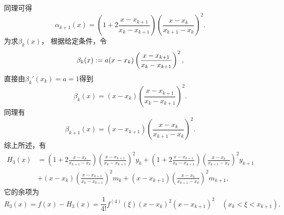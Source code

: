 同理可得\begin{equation*}
	\alpha_{k+1}(x)
	= \left( 1 + 2 \frac{x - x_{k+1}}{x_k - x_{k+1}} \right)
	\left( \frac{x - x_k}{x_{k+1} - x_k} \right)^2.
\end{equation*}
为求\(\beta_k(x)\)，
根据给定条件，令\begin{equation*}
	\beta_k(x)
	:=
	a (x-x_k)
	\left( \frac{x - x_{k+1}}{x_k - x_{k+1}} \right)^2,
\end{equation*}
直接由\(\beta_k'(x_k) = a = 1\)得到\begin{equation*}
	\beta_k(x)
	= (x-x_k)
	\left( \frac{x - x_{k+1}}{x_k - x_{k+1}} \right)^2.
\end{equation*}
同理有\begin{equation*}
	\beta_{k+1}(x)
	= (x-x_{k+1})
	\left( \frac{x - x_k}{x_{k+1} - x_k} \right)^2.
\end{equation*}
综上所述，有\begin{align*}
	H_3(x)
	&= \left( 1 + 2 \frac{x - x_k}{x_{k+1} - x_k} \right)
	\left( \frac{x - x_{k+1}}{x_k - x_{k+1}} \right)^2
	y_k
	+ \left( 1 + 2 \frac{x - x_{k+1}}{x_k - x_{k+1}} \right)
	\left( \frac{x - x_k}{x_{k+1} - x_k} \right)^2
	y_{k+1} \\
	&+ (x - x_k)
	\left( \frac{x - x_{k+1}}{x_k - x_{k+1}} \right)^2
	m_k
	+ (x - x_{k+1})
	\left( \frac{x - x_k}{x_{k+1} - x_k} \right)^2
	m_{k+1},
\end{align*}
它的余项为\begin{equation*}
	R_3(x) = f(x) - H_3(x)
	= \frac1{4!} f^{(4)}(\xi)
	(x - x_k)^2 (x - x_{k+1})^2
	\quad(x_k < \xi < x_{k+1}).
\end{equation*}

